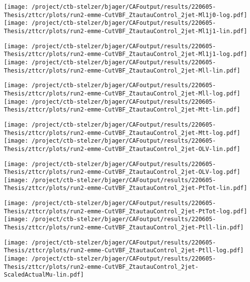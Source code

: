 \documentclass{article}
\begin{document}
\texttt{[image: /project/ctb-stelzer/bjager/CAFoutput/results/220605-Thesis/zttcr/plots/run2-emme-CutVBF\_ZtautauControl\_2jet-Ml1j0-log.pdf]}\texttt{[image: /project/ctb-stelzer/bjager/CAFoutput/results/220605-Thesis/zttcr/plots/run2-emme-CutVBF\_ZtautauControl\_2jet-Ml1j1-lin.pdf]}

\texttt{[image: /project/ctb-stelzer/bjager/CAFoutput/results/220605-Thesis/zttcr/plots/run2-emme-CutVBF\_ZtautauControl\_2jet-Ml1j1-log.pdf]}\texttt{[image: /project/ctb-stelzer/bjager/CAFoutput/results/220605-Thesis/zttcr/plots/run2-emme-CutVBF\_ZtautauControl\_2jet-Mll-lin.pdf]}

\texttt{[image: /project/ctb-stelzer/bjager/CAFoutput/results/220605-Thesis/zttcr/plots/run2-emme-CutVBF\_ZtautauControl\_2jet-Mll-log.pdf]}\texttt{[image: /project/ctb-stelzer/bjager/CAFoutput/results/220605-Thesis/zttcr/plots/run2-emme-CutVBF\_ZtautauControl\_2jet-Mtt-lin.pdf]}

\texttt{[image: /project/ctb-stelzer/bjager/CAFoutput/results/220605-Thesis/zttcr/plots/run2-emme-CutVBF\_ZtautauControl\_2jet-Mtt-log.pdf]}\texttt{[image: /project/ctb-stelzer/bjager/CAFoutput/results/220605-Thesis/zttcr/plots/run2-emme-CutVBF\_ZtautauControl\_2jet-OLV-lin.pdf]}

\texttt{[image: /project/ctb-stelzer/bjager/CAFoutput/results/220605-Thesis/zttcr/plots/run2-emme-CutVBF\_ZtautauControl\_2jet-OLV-log.pdf]}\texttt{[image: /project/ctb-stelzer/bjager/CAFoutput/results/220605-Thesis/zttcr/plots/run2-emme-CutVBF\_ZtautauControl\_2jet-PtTot-lin.pdf]}

\texttt{[image: /project/ctb-stelzer/bjager/CAFoutput/results/220605-Thesis/zttcr/plots/run2-emme-CutVBF\_ZtautauControl\_2jet-PtTot-log.pdf]}\texttt{[image: /project/ctb-stelzer/bjager/CAFoutput/results/220605-Thesis/zttcr/plots/run2-emme-CutVBF\_ZtautauControl\_2jet-Ptll-lin.pdf]}

\texttt{[image: /project/ctb-stelzer/bjager/CAFoutput/results/220605-Thesis/zttcr/plots/run2-emme-CutVBF\_ZtautauControl\_2jet-Ptll-log.pdf]}\texttt{[image: /project/ctb-stelzer/bjager/CAFoutput/results/220605-Thesis/zttcr/plots/run2-emme-CutVBF\_ZtautauControl\_2jet-ScaledActualMu-lin.pdf]}
\end{document}
